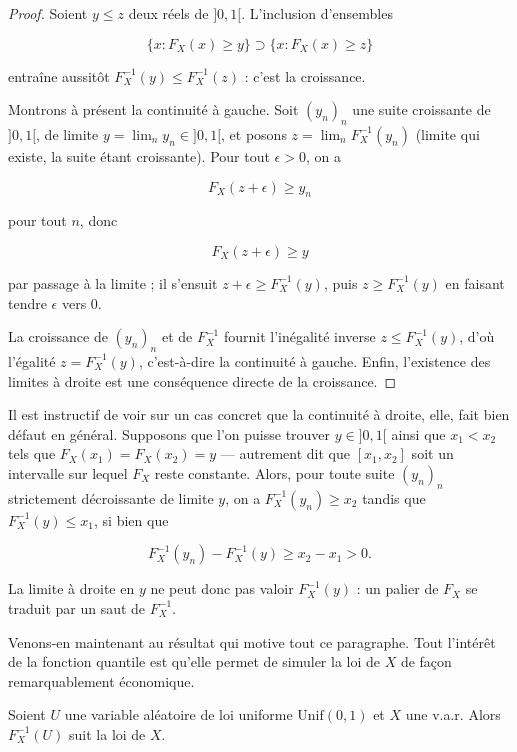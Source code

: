 \begin{proof}
Soient $y \leq z$ deux réels de $]0, 1[$. L'inclusion d'ensembles 

$$
\{x : F_X(x) \geq y\} \supset \{x : F_X(x) \geq z\}
$$
 
entraîne aussitôt $F_X^{-1}(y) \leq F_X^{-1}(z)$ : c'est la croissance. 

Montrons à présent la continuité à gauche. Soit $(y_n)_n$ une suite croissante de $]0, 1[$, de limite $y = \lim_n y_n \in ]0, 1[$, et posons $z = \lim_n F_X^{-1}(y_n)$ (limite qui existe, la suite étant croissante). Pour tout $\epsilon > 0$, on a 

$$
F_X(z + \epsilon) \geq y_n
$$ 

pour tout $n$, donc 

$$
F_X(z + \epsilon) \geq y
$$ 

par passage à la limite ; il s'ensuit $z + \epsilon \geq F_X^{-1}(y)$, puis $z \geq F_X^{-1}(y)$ en faisant tendre $\epsilon$ vers $0$. 

La croissance de $(y_n)_n$ et de $F_X^{-1}$ fournit l'inégalité inverse $z \leq F_X^{-1}(y)$, d'où l'égalité $z = F_X^{-1}(y)$, c'est-à-dire la continuité à gauche. Enfin, l'existence des limites à droite est une conséquence directe de la croissance.
\end{proof}

Il est instructif de voir sur un cas concret que la continuité à droite, elle, fait bien défaut en général. Supposons que l'on puisse trouver $y \in ]0, 1[$ ainsi que $x_1 < x_2$ tels que $F_X(x_1) = F_X(x_2) = y$ — autrement dit que $[x_1, x_2]$ soit un intervalle sur lequel $F_X$ reste constante. Alors, pour toute suite $(y_n)_n$ strictement décroissante de limite $y$, on a $F_X^{-1}(y_n) \geq x_2$ tandis que $F_X^{-1}(y) \leq x_1$, si bien que

$$
F_X^{-1}(y_n) - F_X^{-1}(y) \geq x_2 - x_1 > 0.
$$

La limite à droite en $y$ ne peut donc pas valoir $F_X^{-1}(y)$ : un palier de $F_X$ se traduit par un saut de $F_X^{-1}$.

Venons-en maintenant au résultat qui motive tout ce paragraphe. Tout l'intérêt de la fonction quantile est qu'elle permet de simuler la loi de $X$ de façon remarquablement économique.

\medskip

\begin{mdframed}
\begin{proposition}
Soient $U$ une variable aléatoire de loi uniforme $\text{Unif}(0, 1)$ et $X$ une v.a.r. Alors $F_X^{-1}(U)$ suit la loi de $X$.
\end{proposition}
\end{mdframed}

